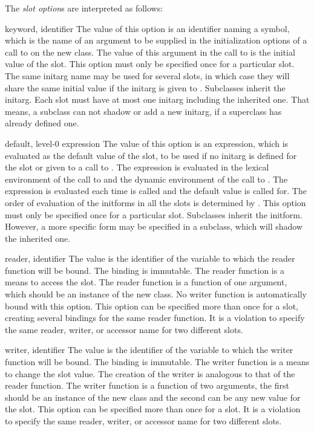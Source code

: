 \begin{optDefinition}
The {\em slot option\/}s are interpreted as follows:
\begin{options}
    \item[keyword, identifier]%
    The value of this option is an identifier naming a symbol, which is the name
    of an argument to be supplied in the initialization options of a call to
     on the new class.  The value of this argument in the call
    to  is the initial value of the slot.  This option must
    only be specified once for a particular slot.  The same initarg name may be
    used for several slots, in which case they will share the same initial value
    if the initarg is given to .  Subclasses inherit the
    initarg. Each slot must have at most one initarg including the inherited
    one. That means, a subclass can not shadow or add a new initarg, if a
    superclass has already defined one.

    \item[default, level-0 expression]%
    The value of this option is an expression, which is evaluated as the default
    value of the slot, to be used if no initarg is defined for the slot or given
    to a call to .  The expression is evaluated in the lexical
    environment of the call to  and the dynamic environment
    of the call to .  The expression is evaluated each time
     is called and the default value is called for.  The order
    of evaluation of the initforms in all the slots is determined by
    .  This option must only be specified once for a
    particular slot. Subclasses inherit the initform.  However, a more specific
    form may be specified in a subclass, which will shadow the inherited one.

    \item[reader, identifier]%
    The value is the identifier of the variable to which the reader function
    will be bound.  The binding is immutable.  The reader function is a means to
    access the slot.  The reader function is a function of one argument, which
    should be an instance of the new class.  No writer function is automatically
    bound with this option.  This option can be specified more than once for a
    slot, creating several bindings for the same reader function. It is a
    violation to specify the same reader, writer, or accessor name for two
    different slots.

    \item[writer, identifier]%
    The value is the identifier of the variable to which the writer function
    will be bound.  The binding is immutable.  The writer function is a means to
    change the slot value.  The creation of the writer is analogous to that of
    the reader function. The writer function is a function of two arguments, the
    first should be an instance of the new class and the second can be any new
    value for the slot.  This option can be specified more than once for a slot.
    It is a violation to specify the same reader, writer, or accessor name
    for two different slots.


\end{options}
\end{optDefinition}
